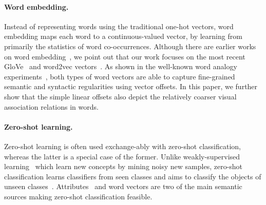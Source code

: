 \documentclass[10pt,twocolumn,letterpaper]{article}
\newcommand{\eat}[1]{{}}
\begin{document}
\eat{
Image tagging method builds model which assigns or ranks a tag set to a given unannotated query image. According to ~\cite{li_socializing_2015}, there are three types of methods: instance-based~\cite{sigurbjornsson_flickr_2008}, model-based~\cite{guillaumin_tagprop:_2009,chen_fast_2013} and transductive-based. These methods aims to assign or rank tags that has already been seen in the training set while our ranking model does not require seeing tags to rank them. And there method ranks discrete items while ours ranks continuous representation.

Indeed, image tagging has been approached from the tag ranking perspective for decades. 
}


\paragraph{Word embedding.}
Instead of representing words using the traditional one-hot vectors, word embedding maps each word to a continuous-valued vector, by  learning from primarily the statistics of word co-occurrences. Although there are earlier works on word embedding~\cite{rumelhart_learning_1985,deerwester_indexing_1990}, we point out that our work focuses on  the most recent GloVe~\cite{pennington_glove:_2014} and word2vec vectors~\cite{mikolov_linguistic_2013,mikolov_distributed_2013,mikolov_efficient_2013}. As shown in the well-known word analogy experiments~\cite{mikolov_linguistic_2013,pennington_glove:_2014}, both types of word vectors are able to capture fine-grained semantic and syntactic regularities using vector offsets. In this paper, we further show that the simple linear offsets also depict the relatively coarser visual association relations in words.
\vspace{-10pt}
 
\paragraph{Zero-shot learning.}
Zero-shot learning is often used exchange-ably with zero-shot classification, whereas the latter is a special case of the former. Unlike weakly-supervised learning~\cite{moxley_video_2010,fu_relaxing_2015} which learn new concepts by mining noisy new samples, zero-shot classification learns classifiers from seen classes and aims to classify the objects of unseen classes~\cite{palatucci_zero-shot_2009,norouzi_zero-shot_2013,lampert_attribute-based_2014,akata_label-embedding_2013,fu_transductive_2014,jayaraman_zero-shot_2014,norouzi_zero-shot_2013,palatucci_zero-shot_2009,socher_zero-shot_2013}. \eat{It has been considered a promising technique for handling the scarce training data of rare classes.} Attributes~\cite{lampert_learning_2009,farhadi_describing_2009} and word vectors are two of the main semantic sources making zero-shot classification feasible. 
\end{document}

